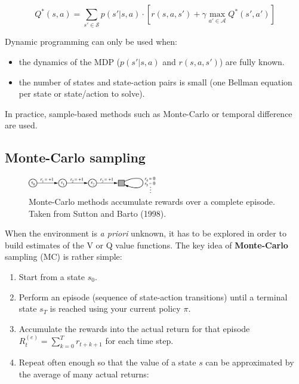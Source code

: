 \documentclass[
  letterpaper,
  DIV=11,
  numbers=noendperiod]{scrreprt}
\providecommand{\tightlist}{%
  \setlength{\itemsep}{0pt}\setlength{\parskip}{0pt}}\usepackage{longtable,booktabs,array}
\begin{document}
\[
    Q^{*}(s, a) = \sum_{s' \in \mathcal{S}} p(s' | s, a) \cdot [r(s, a, s') + \gamma \max_{a' \in \mathcal{A}} Q^* (s', a') ]
\]

Dynamic programming can only be used when:

\begin{itemize}
\tightlist
\item
  the dynamics of the MDP (\(p(s'|s, a)\) and \(r(s, a, s')\)) are fully
  known.
\item
  the number of states and state-action pairs is small (one Bellman
  equation per state or state/action to solve).
\end{itemize}

In practice, sample-based methods such as Monte-Carlo or temporal
difference are used.

\hypertarget{monte-carlo-sampling}{%
\subsection{Monte-Carlo sampling}\label{monte-carlo-sampling}}

\begin{figure}

{\centering \includegraphics[width=0.5\textwidth,height=\textheight]{./img/unifiedreturn.png}

}

\caption{\label{fig-mc}Monte-Carlo methods accumulate rewards over a
complete episode. Taken from Sutton and Barto (1998).}

\end{figure}

When the environment is \emph{a priori} unknown, it has to be explored
in order to build estimates of the V or Q value functions. The key idea
of \textbf{Monte-Carlo} sampling (MC) is rather simple:

\begin{enumerate}
\def\labelenumi{\arabic{enumi}.}
\tightlist
\item
  Start from a state \(s_0\).
\item
  Perform an episode (sequence of state-action transitions) until a
  terminal state \(s_T\) is reached using your current policy \(\pi\).
\item
  Accumulate the rewards into the actual return for that episode
  \(R_t^{(e)} = \sum_{k=0}^T r_{t+k+1}\) for each time step.
\item
  Repeat often enough so that the value of a state \(s\) can be
  approximated by the average of many actual returns:
\end{enumerate}
\end{document}
